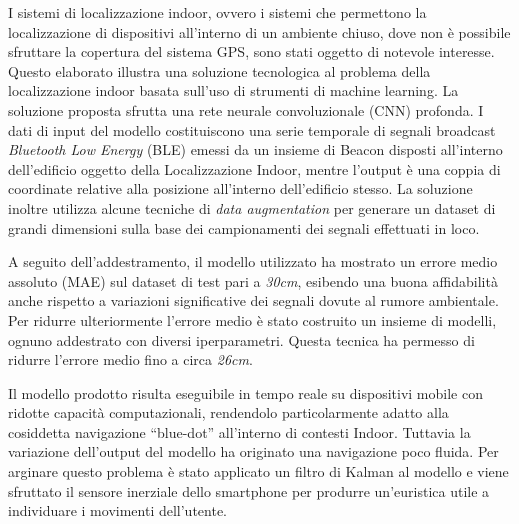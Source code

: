 \documentclass{standalone}
\begin{document}
I sistemi di localizzazione indoor, ovvero i sistemi che permettono la
localizzazione di dispositivi all’interno di un ambiente chiuso, dove non è
possibile sfruttare la copertura del sistema GPS, sono stati oggetto di
notevole interesse. Questo elaborato illustra una soluzione tecnologica al
problema della localizzazione indoor basata sull’uso di strumenti di machine
learning. La soluzione proposta sfrutta una rete neurale convoluzionale (CNN)
profonda. I dati di input del modello costituiscono una serie temporale di
segnali broadcast \emph{Bluetooth Low Energy} (BLE) emessi da un insieme di
Beacon disposti all’interno dell’edificio oggetto della Localizzazione Indoor,
mentre l’output è una coppia di coordinate relative alla posizione all’interno
dell’edificio stesso. La soluzione inoltre utilizza alcune tecniche di
\emph{data augmentation} per generare un dataset di grandi dimensioni sulla
base dei campionamenti dei segnali effettuati in loco.

A seguito dell’addestramento, il modello utilizzato ha mostrato un errore medio
assoluto (MAE) sul dataset di test pari a \emph{30cm}, esibendo una buona
affidabilità anche rispetto a variazioni significative dei segnali dovute al
rumore ambientale. Per ridurre ulteriormente l’errore medio  è stato costruito
un insieme di modelli, ognuno addestrato con diversi iperparametri. Questa
tecnica ha permesso di ridurre l’errore medio fino a circa \emph{26cm}.

Il modello prodotto risulta eseguibile in tempo reale su dispositivi mobile con
ridotte capacità computazionali, rendendolo particolarmente adatto alla
cosiddetta navigazione ``blue-dot'' all’interno di contesti Indoor. Tuttavia la
variazione dell’output del modello ha originato una navigazione poco fluida.
Per arginare questo problema è stato applicato un filtro di Kalman al modello e
viene sfruttato il sensore inerziale dello smartphone per produrre un’euristica
utile a individuare i movimenti dell’utente.
\end{document}
